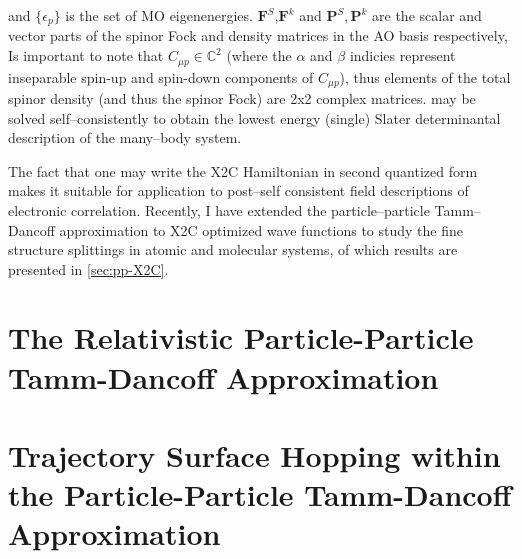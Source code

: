 \documentclass[12pt]{article}
\newcommand*\vc[1]{\boldsymbol{#1}}
\begin{document}
and $\{\epsilon_p\}$ is the set of MO
eigenenergies. $\vc{F}^S$,$\vc{F}^k$ and $\vc{P}^S,\vc{P}^k$ are the scalar and
vector parts of the spinor Fock and density matrices in the AO basis
respectively, 
Is important to note that $C_{\mu p} \in \mathbb{C}^2$ (where the $\alpha$ and
$\beta$ indicies represent inseparable spin-up and spin-down components of
$C_{\mu p}$), thus elements of the total spinor density (and thus the spinor
Fock) are 2x2 complex matrices.   may be solved
self--consistently to obtain the lowest energy (single) Slater determinantal
description of the many--body system.

The fact that one may write the X2C Hamiltonian in second quantized form makes it
suitable for application to post--self consistent field descriptions of
electronic correlation. Recently, I have extended the particle--particle
Tamm--Dancoff approximation to X2C optimized wave functions to study the fine
structure splittings in atomic and molecular systems, of which results are
presented in \cref{sec:pp-X2C}.


\linespread{1.0}
\section{The Relativistic Particle-Particle Tamm-Dancoff Approximation}
\linespread{1.5}
\label{sec:pp-X2C}
\linespread{1.0}
\section{Trajectory Surface Hopping within the Particle-Particle Tamm-Dancoff Approximation}
\linespread{1.5}
\label{sec:pp-TSH}
\end{document}
